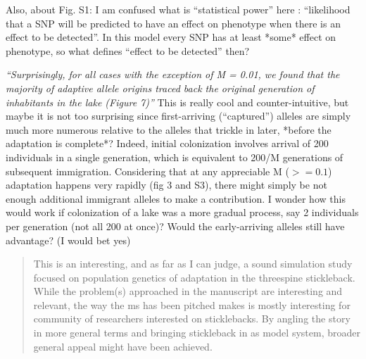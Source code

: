 \begin{point}{}
Also, about Fig. S1: I am confused what is ``statistical power'' here :
``likelihood that a SNP will be predicted to have an effect on phenotype when
there is an effect to be detected''. In this model every SNP has at least *some*
effect on phenotype, so what defines ``effect to be detected'' then?
\end{point}


\begin{point}{\revref}
    \textit{``Surprisingly, for all cases with the exception of M = 0.01, we found that the
    majority of adaptive allele origins traced back the original generation of
    inhabitants in the lake (Figure 7)''}
    This is really cool and counter-intuitive,
    but maybe it is not too surprising since first-arriving (``captured'') alleles
    are simply much more numerous relative to the alleles that trickle in later,
    *before the adaptation is complete*? Indeed, initial colonization involves
    arrival of 200 individuals in a single generation, which is equivalent to 200/M
    generations of subsequent immigration. Considering that at any appreciable M
    ($>=0.1$) adaptation happens very rapidly (fig 3 and S3), there might simply be
    not enough additional immigrant alleles to make a contribution. I wonder how
    this would work if colonization of a lake was a more gradual process, say 2
    individuals per generation (not all 200 at once)? Would the early-arriving
    alleles still have advantage? (I would bet yes)
\end{point}




\begin{quote}
    This is an interesting, and as far as I can judge, a sound simulation study
    focused on population genetics of adaptation in the threespine stickleback.
    While the problem(s) approached in the manuscript are interesting and relevant,
    the way the ms has been pitched makes is mostly interesting for community of
    researchers interested on sticklebacks. By angling the story in more general
    terms and bringing stickleback in as model system, broader general appeal might
    have been achieved.
\end{quote}


